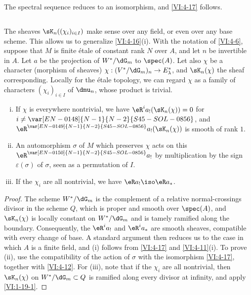 The spectral sequence reduces to an isomorphism, and \ref{VI:4-17} follows. 





\subsection{}\label{VI:4-19}

The sheaves $\sK_n((\chi_i)_{i\in I})$ make sense over any field, 
or even over any base scheme. This allows us to generalize 
\ref{VI:4-16}(i). With the notation of \ref{VI:4-6}, suppose that $M$ is finite 
étale of constant rank $N$ over $A$, and let $n$ be invertible in $A$. 
Let $a$ be the projection of $W^\ast/\dG_m$ to $\spec(A)$. Let also $\chi$ be 
a character (morphism of sheaves) 
$\chi:(V^\ast/\dG_m)_n \to E_\lambda^\ast$, and $\sK_n(\chi)$ the sheaf 
corresponding. Locally for the étale topology, we can regard $\chi$ 
as a family of characters $(\chi_i)_{i\in I}$ of $\dmu_n$, whose product is 
trivial.

\begin{proposition_}\label{VI:4-20}
\begin{enumerate}[(i)]
  \item If $\chi$ is everywhere nontrivial, we have 
    $\eR^i a_! (\sK_n(\chi)) = 0$ for $i\ne \var[EN-0148]{N-1}{N-2}{S45-SOL-0856}$, and 
    $\eR^{\var[EN-0149]{N-1}{N-2}{S45-SOL-0856}} a_!(\sK_n(\chi))$ is smooth of rank $1$. 
  \item An automorphism $\sigma$ of $M$ which preserves $\chi$ acts on this 
    $\eR^{\var[EN-0150]{N-1}{N-2}{S45-SOL-0856}} a_!$ by multiplication by the sign $\varepsilon(\sigma)$ 
    of $\sigma$, seen as a permutation of $I$. 
  \item If the $\chi_i$ are all nontrivial, we have $\eR a_! \iso \eR a_\ast$. 
\end{enumerate}
\end{proposition_}
\begin{proof}[Proof]
The scheme $W^\ast/\dG_m$ is the complement of a relative normal-crossings 
divisor in the scheme $Q$, which is proper and smooth over $\spec(A)$, and 
$\sK_n(\chi)$ is 
locally constant on $W^\ast/\dG_m$ and is tamely ramified 
along the boundary. Consequently, the $\eR^i a_!$ and 
$\eR^i a_\ast$ are smooth sheaves, compatible with every change of 
base. A standard argument then reduces us to the case in which $A$ is a 
finite field, and (i) follows from \ref{VI:4-17} and \ref{VI:4-11}(i). 
To prove (ii), use the compatibility of the action of $\sigma$ with 
the isomorphism \ref{VI:4-17}, together with \ref{VI:4-12}. For (iii), note that if the 
$\chi_i$ are all nontrivial, then $\sK_n(\chi)$ on 
$W^\ast/\dG_m\subset Q$ is ramified along every divisor at infinity, 
and apply \ref{VI:1-19-1}. 
\end{proof}











